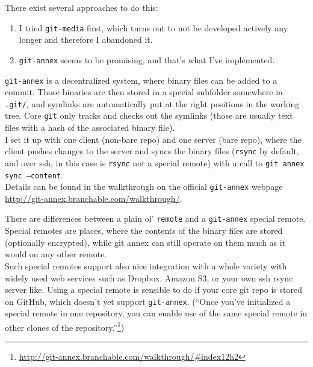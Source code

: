 \documentclass[12pt]{article}
\newenvironment{solution}[2][Solution]{\begin{trivlist}
\item[\hskip \labelsep {\bfseries #1}]}{\end{trivlist}}
\newenvironment{problem}[2][Problem]{\begin{trivlist}
\item[\hskip \labelsep {\bfseries #1}\hskip \labelsep {\bfseries #2.}]}{\end{trivlist}}
\begin{document}
\begin{solution}{}
There exist several approaches to do this: 
    \begin{enumerate} 
    \item I tried \texttt{git-media} first, which turns out to not be developed actively any longer and therefore I abandoned it.
    \item \texttt{git-annex} seems to be promising, and that's what I've implemented. 
\end{enumerate}

    \texttt{git-annex} is a decentralized system, where binary files can be added to a commit. Those binaries are then stored in a special subfolder somewhere in \texttt{.git/}, and symlinks are automatically put at the right positions in the working tree. Core \texttt{git} only tracks and checks out the symlinks (those are usually text files with a hash of the associated binary file). \\
    I set it up with one client (non-bare repo) and one server (bare repo), where the client pushes changes to the server and syncs the binary files (\texttt{rsync} by default, and over ssh, in this case is \texttt{rsync} not a special remote) with a call to \texttt{git annex sync --content}. \\
  Details can be found in the walkthrough on the official \texttt{git-annex} webpage \url{http://git-annex.branchable.com/walkthrough/}. \\
\end{solution}

\begin{problem}{2}
    There are differences between a plain ol' \texttt{remote} and a \texttt{git-annex} special remote. Special remotes are places, where the contents of the binary files are stored (optionally encrypted), while git annex can still operate on them much as it would on any other remote. \\ Such special remotes support also nice integration with a whole variety with widely used web services such as Dropbox, Amazon S3, or your own ssh rsync server like. Using a special remote is sensible to do if your core git repo is stored on GitHub, which doesn't yet support \texttt{git-annex}. (\enquote{Once you've initialized a special remote in one repository, you can enable use of the same special remote in other clones of the repository.}\footnote{ \url{http://git-annex.branchable.com/walkthrough/#index12h2} })
\end{problem}
\end{document}
